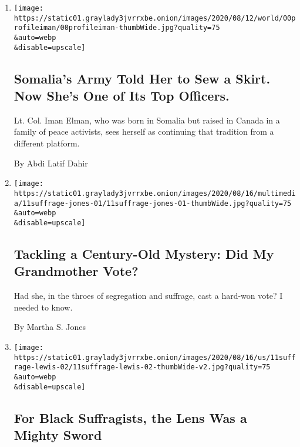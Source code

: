 \begin{enumerate}
\def\labelenumi{\arabic{enumi}.}
\item
  \href{/2020/08/14/world/africa/iman-elman-woman-Somalia-army.html}{}

  \texttt{[image: https://static01.graylady3jvrrxbe.onion/images/2020/08/12/world/00profileiman/00profileiman-thumbWide.jpg?quality=75\\\&auto=webp\\\&disable=upscale]}

  \hypertarget{somalias-army-told-her-to-sew-a-skirt-now-shes-one-of-its-top-officers}{%
  \subsection{Somalia's Army Told Her to Sew a Skirt. Now She's One of
  Its Top
  Officers.}\label{somalias-army-told-her-to-sew-a-skirt-now-shes-one-of-its-top-officers}}

  Lt. Col. Iman Elman, who was born in Somalia but raised in Canada in a
  family of peace activists, sees herself as continuing that tradition
  from a different platform.

  By Abdi Latif Dahir
\item
  \href{/2020/08/14/us/suffrage-segregation-voting-black-women-19th-amendment.html}{}

  \texttt{[image: https://static01.graylady3jvrrxbe.onion/images/2020/08/16/multimedia/11suffrage-jones-01/11suffrage-jones-01-thumbWide.jpg?quality=75\\\&auto=webp\\\&disable=upscale]}

  \hypertarget{tackling-a-century-old-mystery-did-my-grandmother-vote}{%
  \subsection{Tackling a Century-Old Mystery: Did My Grandmother
  Vote?}\label{tackling-a-century-old-mystery-did-my-grandmother-vote}}

  Had she, in the throes of segregation and suffrage, cast a hard-won
  vote? I needed to know.

  By Martha S. Jones
\item
  \href{/2020/08/12/arts/19th-amendment-black-womens-suffrage-photos.html}{}

  \texttt{[image: https://static01.graylady3jvrrxbe.onion/images/2020/08/16/us/11suffrage-lewis-02/11suffrage-lewis-02-thumbWide-v2.jpg?quality=75\\\&auto=webp\\\&disable=upscale]}

  \hypertarget{for-black-suffragists-the-lens-was-a-mighty-sword}{%
  \subsection{For Black Suffragists, the Lens Was a Mighty
  Sword}\label{for-black-suffragists-the-lens-was-a-mighty-sword}}


\end{enumerate}

